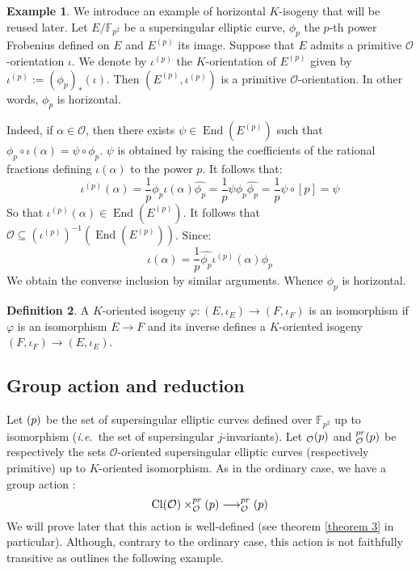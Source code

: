 \documentclass[a4paper,10pt]{report}
\theoremstyle{definition}
\newtheorem{definition}{Definition}[chapter]
\theoremstyle{plain}
\theoremstyle{definition}
\newtheorem{example}[definition]{Example}
\newcommand{\ie}{\emph{i.e.}\ }
\newcommand{\F}{\mathbb{F}}
\newcommand{\mO}{\mathcal{O}}
\renewcommand{\(}{\left(}
\renewcommand{\)}{\right)}
\DeclareMathOperator{\End}{End}
\DeclareMathOperator{\Cl}{Cl}
\let\SS\relax
\DeclareMathOperator{\SS}{SS}
\begin{document}
\begin{example}
We introduce an example of horizontal $K$-isogeny that will be reused later.  Let $E/\F_{p^2}$ be a supersingular elliptic curve, $\phi_p$ the $p$-th power Frobenius defined on $E$ and $E^{(p)}$ its image. Suppose that $E$ admits a primitive $\mO$-orientation $\iota$.  We denote by $\iota^{(p)}$ the $K$-orientation of $E^{(p)}$ given by $\iota^{(p)}:=(\phi_p)_*(\iota)$.  Then $(E^{(p)},\iota^{(p)})$ is a primitive $\mO$-orientation.  In other words, $\phi_p$ is horizontal.

Indeed, if $\alpha\in\mO$, then there exists $\psi\in\End(E^{(p)})$ such that $\phi_p\circ\iota(\alpha)=\psi\circ\phi_p$. $\psi$ is obtained by raising the coefficients of the rational fractions defining $\iota(\alpha)$ to the power $p$. It follows that:
\[\iota^{(p)}(\alpha)=\frac{1}{p}\phi_p\iota(\alpha)\widehat{\phi_p}=\frac{1}{p}\psi\phi_p\widehat{\phi_p}=\frac{1}{p}\psi\circ[p]=\psi\]
So that $\iota^{(p)}(\alpha)\in\End(E^{(p)})$. It follows that $\mO\subseteq\(\iota^{(p)}\)^{-1}\(\End\(E^{(p)}\)\)$. Since:
\[\iota(\alpha)=\frac{1}{p}\widehat{\phi_p}\iota^{(p)}(\alpha)\phi_p\]
We obtain the converse inclusion by similar arguments.  Whence $\phi_p$ is horizontal.
\end{example}

\begin{definition}
A $K$-oriented isogeny $\varphi : (E, \iota_E)\longrightarrow(F,\iota_F)$ is an isomorphism if $\varphi$ is an isomorphism $E\longrightarrow F$ and its inverse defines a $K$-oriented isogeny $(F, \iota_F)\longrightarrow(E,\iota_E)$.
\end{definition}

\subsection{Group action and reduction}

Let $\SS(p)$ be the set of supersingular elliptic curves defined over $\F_{p^2}$ up to isomorphism (\ie the set of supersingular $j$-invariants). Let $\SS_{\mO}(p)$ and $\SS_{\mO}^{pr}(p)$ be respectively the sets $\mO$-oriented supersingular elliptic curves (respectively primitive) up to $K$-oriented isomorphism.  As in the ordinary case,  we have a group action :
\[\Cl(\mO)\times \SS_{\mO}^{pr}(p) \longrightarrow \SS_{\mO}^{pr}(p)\]
We will prove later that this action is well-defined (see theorem \ref{theorem 3} in particular).  Although,  contrary to the ordinary case,  this action is not faithfully transitive as outlines the following example.
\end{document}
